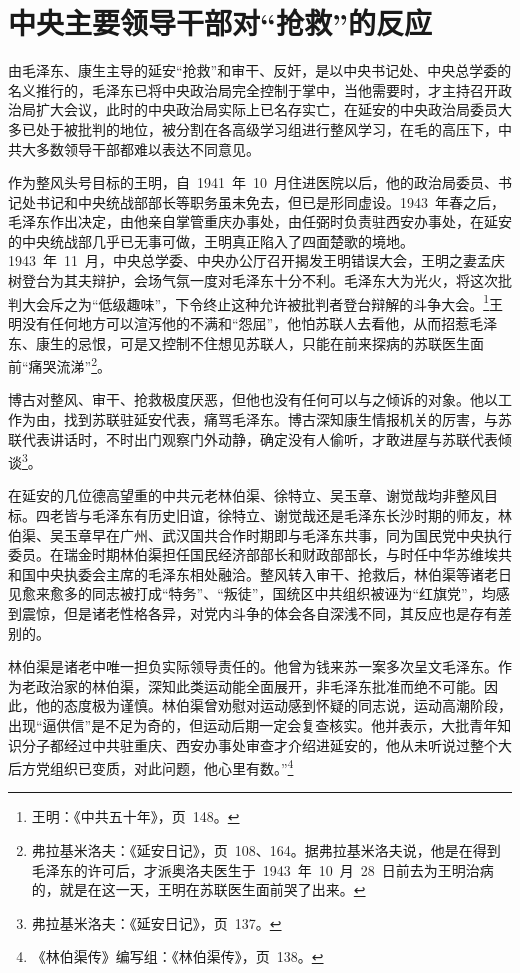 \section{中央主要领导干部对“抢救”的反应}

由毛泽东、康生主导的延安“抢救”和审干、反奸，是以中央书记处、中央总学委的名义推行的，毛泽东已将中央政治局完全控制于掌中，当他需要时，才主持召开政治局扩大会议，此时的中央政治局实际上已名存实亡，在延安的中央政治局委员大多已处于被批判的地位，被分割在各高级学习组进行整风学习，在毛的高压下，中共大多数领导干部都难以表达不同意见。

作为整风头号目标的王明，自~1941~年~10~月住进医院以后，他的政治局委员、书记处书记和中央统战部部长等职务虽未免去，但已是形同虚设。1943~年春之后，毛泽东作出决定，由他亲自掌管重庆办事处，由任弼时负责驻西安办事处，在延安的中央统战部几乎已无事可做，王明真正陷入了四面楚歌的境地。1943~年~11~月，中央总学委、中央办公厅召开揭发王明错误大会，王明之妻孟庆树登台为其夫辩护，会场气氛一度对毛泽东十分不利。毛泽东大为光火，将这次批判大会斥之为“低级趣味”，下令终止这种允许被批判者登台辩解的斗争大会。\footnote{王明：《中共五十年》，页~148。}王明没有任何地方可以渲泻他的不满和“怨屈”，他怕苏联人去看他，从而招惹毛泽东、康生的忌恨，可是又控制不住想见苏联人，只能在前来探病的苏联医生面前“痛哭流涕”\footnote{弗拉基米洛夫：《延安日记》，页~108、164。据弗拉基米洛夫说，他是在得到毛泽东的许可后，才派奥洛夫医生于~1943~年~10~月~28~日前去为王明治病的，就是在这一天，王明在苏联医生面前哭了出来。}。

博古对整风、审干、抢救极度厌恶，但他也没有任何可以与之倾诉的对象。他以工作为由，找到苏联驻延安代表，痛骂毛泽东。博古深知康生情报机关的厉害，与苏联代表讲话时，不时出门观察门外动静，确定没有人偷听，才敢进屋与苏联代表倾谈\footnote{弗拉基米洛夫：《延安日记》，页~137。}。

在延安的几位德高望重的中共元老林伯渠、徐特立、吴玉章、谢觉哉均非整风目标。四老皆与毛泽东有历史旧谊，徐特立、谢觉哉还是毛泽东长沙时期的师友，林伯渠、吴玉章早在广州、武汉国共合作时期即与毛泽东共事，同为国民党中央执行委员。在瑞金时期林伯渠担任国民经济部部长和财政部部长，与时任中华苏维埃共和国中央执委会主席的毛泽东相处融洽。整风转入审干、抢救后，林伯渠等诸老日见愈来愈多的同志被打成“特务”、“叛徒”，国统区中共组织被诬为“红旗党”，均感到震惊，但是诸老性格各异，对党内斗争的体会各自深浅不同，其反应也是存有差别的。

林伯渠是诸老中唯一担负实际领导责任的。他曾为钱来苏一案多次呈文毛泽东。作为老政治家的林伯渠，深知此类运动能全面展开，非毛泽东批准而绝不可能。因此，他的态度极为谨慎。林伯渠曾劝慰对运动感到怀疑的同志说，运动高潮阶段，出现“逼供信”是不足为奇的，但运动后期一定会复查核实。他并表示，大批青年知识分子都经过中共驻重庆、西安办事处审查才介绍进延安的，他从未听说过整个大后方党组织已变质，对此问题，他心里有数。”\footnote{《林伯渠传》编写组：《林伯渠传》，页~138。}

